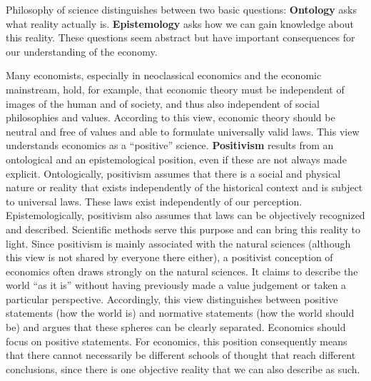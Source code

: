 \documentclass[
  british,
  a4paper,
  DIV=11,
  numbers=noendperiod,
  oneside,
  openany]{scrreprt}
\begin{document}
Philosophy of science distinguishes between two basic questions:
\textbf{Ontology} asks what reality actually is. \textbf{Epistemology}
asks how we can gain knowledge about this reality. These questions seem
abstract but have important consequences for our understanding of the
economy.

Many economists, especially in neoclassical economics and the economic
mainstream, hold, for example, that economic theory must be independent
of images of the human and of society, and thus also independent of
social philosophies and values. According to this view, economic theory
should be neutral and free of values and able to formulate universally
valid laws. This view understands economics as a ``positive'' science.
\textbf{Positivism} results from an ontological and an epistemological
position, even if these are not always made explicit. Ontologically,
positivism assumes that there is a social and physical nature or reality
that exists independently of the historical context and is subject to
universal laws. These laws exist independently of our perception.
Epistemologically, positivism also assumes that laws can be objectively
recognized and described. Scientific methods serve this purpose and can
bring this reality to light. Since positivism is mainly associated with
the natural sciences (although this view is not shared by everyone there
either), a positivist conception of economics often draws strongly on
the natural sciences. It claims to describe the world ``as it is''
without having previously made a value judgement or taken a particular
perspective. Accordingly, this view distinguishes between positive
statements (how the world is) and normative statements (how the world
should be) and argues that these spheres can be clearly separated.
Economics should focus on positive statements. For economics, this
position consequently means that there cannot necessarily be different
schools of thought that reach different conclusions, since there is one
objective reality that we can also describe as such.
\end{document}

